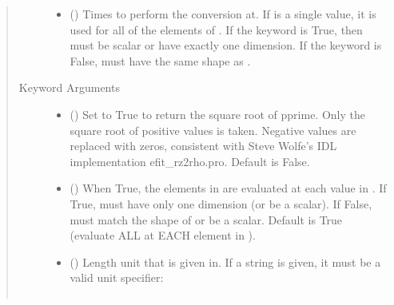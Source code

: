 \documentclass[letterpaper,10pt,english]{sphinxmanual}
\begin{document}
\begin{fulllineitems}
\begin{fulllineitems}
\begin{quote}
\begin{description}
\begin{itemize}
\item {} 
 () \textendash{} Times to perform the conversion at.
If  is a single value, it is used for all of the elements of
. If the  keyword is True, then  must be scalar
or have exactly one dimension. If the  keyword is False,
 must have the same shape as .

\end{itemize}

\item[{Keyword Arguments}] \leavevmode\begin{itemize}
\item {} 
 () \textendash{} Set to True to return the square root of pprime.
Only the square root of positive values is taken. Negative
values are replaced with zeros, consistent with Steve Wolfe’s
IDL implementation efit\_rz2rho.pro. Default is False.

\item {} 
 () \textendash{} When True, the elements in  are evaluated
at each value in . If True,  must have only one dimension
(or be a scalar). If False,  must match the shape of 
or be a scalar. Default is True (evaluate ALL  at EACH
element in ).

\item {} 
 () \textendash{} 
Length unit that  is given in.
If a string is given, it must be a valid unit specifier:
\begin{quote}


\begin{savenotes}\sphinxattablestart
\centering
\begin{tabulary}{\linewidth}[t]{|T|T|}
\hline


\end{tabulary}
\end{savenotes}
\end{quote}
\end{itemize}
\end{description}
\end{quote}
\end{fulllineitems}
\end{fulllineitems}
\end{document}
